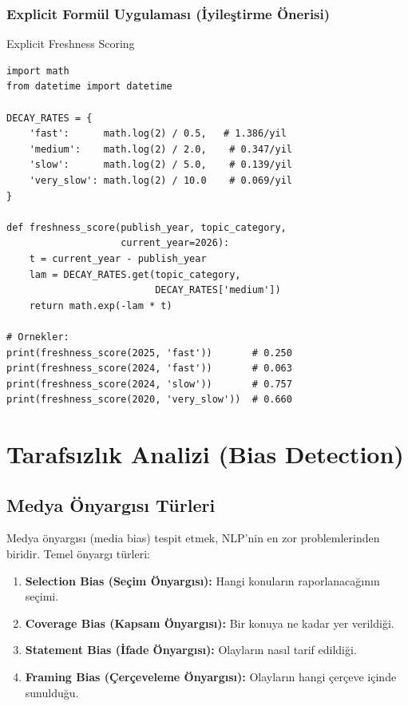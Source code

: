 \subsubsection{Explicit Form\"{u}l Uygulamas{\i} (\.{I}yile\c{s}tirme \"{O}nerisi)}

\begin{kodref}{Explicit Freshness Scoring}
\begin{lstlisting}
import math
from datetime import datetime

DECAY_RATES = {
    'fast':      math.log(2) / 0.5,   # 1.386/yil
    'medium':    math.log(2) / 2.0,    # 0.347/yil
    'slow':      math.log(2) / 5.0,    # 0.139/yil
    'very_slow': math.log(2) / 10.0    # 0.069/yil
}

def freshness_score(publish_year, topic_category,
                    current_year=2026):
    t = current_year - publish_year
    lam = DECAY_RATES.get(topic_category,
                          DECAY_RATES['medium'])
    return math.exp(-lam * t)

# Ornekler:
print(freshness_score(2025, 'fast'))       # 0.250
print(freshness_score(2024, 'fast'))       # 0.063
print(freshness_score(2024, 'slow'))       # 0.757
print(freshness_score(2020, 'very_slow'))  # 0.660
\end{lstlisting}
\end{kodref}


\section{Tarafs{\i}zl{\i}k Analizi (Bias Detection)}
\label{sec:bias-detection}

\subsection{Medya \"{O}nyarg{\i}s{\i} T\"{u}rleri}

Medya \"{o}nyarg{\i}s{\i} (media bias) tespit etmek, NLP'nin en zor problemlerinden biridir. Temel \"{o}nyarg{\i} t\"{u}rleri:

\begin{enumerate}
  \item \textbf{Selection Bias (Se\c{c}im \"{O}nyarg{\i}s{\i}):} Hangi konular{\i}n raporlanaca\u{g}{\i}n{\i}n se\c{c}imi.
  \item \textbf{Coverage Bias (Kapsam \"{O}nyarg{\i}s{\i}):} Bir konuya ne kadar yer verildi\u{g}i.
  \item \textbf{Statement Bias (\.{I}fade \"{O}nyarg{\i}s{\i}):} Olaylar{\i}n nas{\i}l tarif edildi\u{g}i.
  \item \textbf{Framing Bias (\c{C}er\c{c}eveleme \"{O}nyarg{\i}s{\i}):} Olaylar{\i}n hangi \c{c}er\c{c}eve i\c{c}inde sunuldu\u{g}u.
\end{enumerate}


